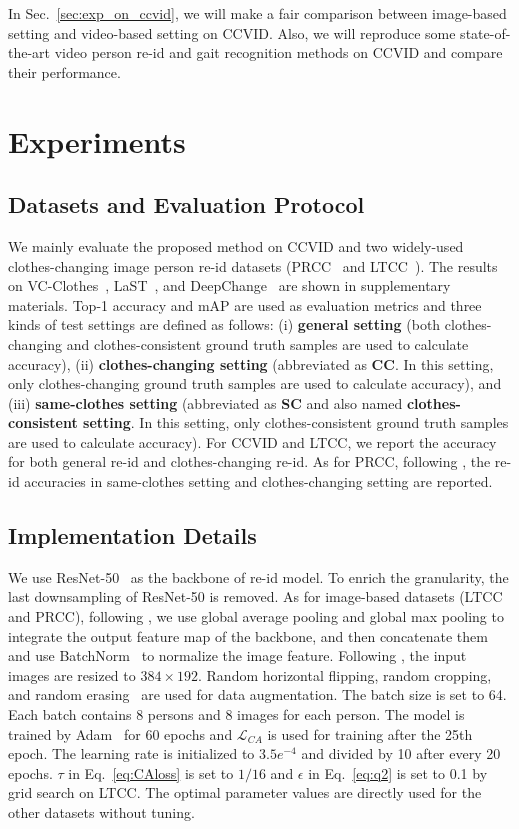 \documentclass[10pt,twocolumn,letterpaper]{article}
\begin{document}
In Sec.~\ref{sec:exp_on_ccvid}, we will make a fair comparison between image-based setting and video-based setting on CCVID.
Also, we will reproduce some state-of-the-art video person re-id and gait recognition methods on CCVID and compare their performance.

\section{Experiments}
\label{sec:exp}

\subsection{Datasets and Evaluation Protocol}
We mainly evaluate the proposed method on CCVID and two widely-used clothes-changing image person re-id datasets (\ie PRCC~\cite{Yang2019PRCC} and LTCC~\cite{Qian2020LTCC}).
The results on VC-Clothes~\cite{Real28}, LaST~\cite{LaST}, and DeepChange~\cite{DeepChange} are shown in supplementary materials. Top-1 accuracy and mAP are used as evaluation metrics and three kinds of test settings are defined as follows:
(i) \textbf{general setting} (both clothes-changing and clothes-consistent ground truth samples are used to calculate accuracy),
(ii) \textbf{clothes-changing setting} (abbreviated as \textbf{CC}. In this setting, only clothes-changing ground truth samples are used to calculate accuracy), and (iii) \textbf{same-clothes setting} (abbreviated as \textbf{SC} and also named \textbf{clothes-consistent setting}. In this setting, only clothes-consistent ground truth samples are used to calculate accuracy).
For CCVID and LTCC, we report the accuracy for both general re-id and clothes-changing re-id.
As for PRCC, following \cite{Yang2019PRCC}, the re-id accuracies in same-clothes setting and clothes-changing setting are reported.


\subsection{Implementation Details}
\label{sec:detail}
We use ResNet-50~\cite{He2016Deep} as the backbone of re-id model. 
To enrich the granularity, the last downsampling of ResNet-50 is removed.
As for image-based datasets (\ie LTCC and PRCC), following \cite{Huang2021Clothing}, we use global average pooling and global max pooling to integrate the output feature map of the backbone, and then concatenate them and use BatchNorm~\cite{Ioffe2015BN} to normalize the image feature.
Following \cite{Qian2020LTCC}, the input images are resized to $384\times192$. Random horizontal flipping, random cropping, and random erasing~\cite{zhong2020random} are used for data augmentation. The batch size is set to 64. Each batch contains 8 persons and 8 images for each person. The model is trained by Adam~\cite{Kingma2014Adam} for 60 epochs and $\mathcal{L}_{CA}$ is used for training after the 25th epoch.
The learning rate is initialized to $3.5e^{-4}$ and divided by 10 after every 20 epochs. 
$\tau$ in Eq.~\eqref{eq:CAloss} is set to $1/16$ and $\epsilon$ in Eq.~\eqref{eq:q2} is set to 0.1 by grid search on LTCC.
The optimal parameter values are directly used for the other datasets without tuning.
\end{document}
